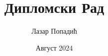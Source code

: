 \documentclass[12pt]{article}
\title{Дипломски Рад}
\author{Лазар Попадић}
\date{Август 2024}
\begin{document}
\tableofcontents
\newpage

\end{document}
